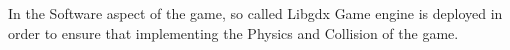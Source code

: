 In the Software aspect of the game, so called Libgdx Game engine is deployed in order to ensure that implementing the Physics and Collision of the game.